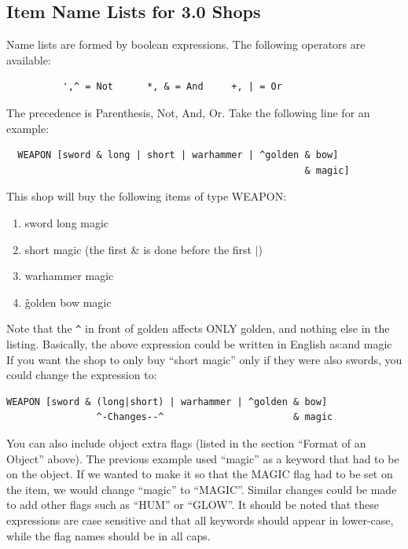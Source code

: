 \documentclass[11pt]{article}
\begin{document}
\subsection{Item Name Lists for 3.0 Shops}
Name lists are formed by boolean expressions.  The following operators are available:
\begin{verbatim}
          ',^ = Not      *, & = And     +, | = Or
\end{verbatim}
The precedence is Parenthesis, Not, And, Or.  Take the following line for an example:
\begin{verbatim}
  WEAPON [sword & long | short | warhammer | ^golden & bow]
                                                     & magic]
\end{verbatim}
This shop will buy the following items of type WEAPON:
\begin{enumerate}
\item sword long magic
\item short magic (the first \& is done before the first $|$)
\item warhammer magic
\item \^golden bow magic
\end{enumerate}
Note that the \texttt{\^} in front of golden affects ONLY golden, and nothing else in the listing.  Basically, the above expression could be written in English as: and magic\newline
If you want the shop to only buy ``short magic'' only if they were also swords, you could change the expression to:
\begin{verbatim}
WEAPON [sword & (long|short) | warhammer | ^golden & bow]
                ^-Changes--^                       & magic
\end{verbatim}
You can also include object extra flags (listed in the section ``Format of an Object'' above).  The previous example used ``magic'' as a keyword that had to be on the object.  If we wanted to make it so that the MAGIC flag had to be set on the item, we would change ``magic'' to ``MAGIC''.  Similar changes could be made to add other flags such as ``HUM'' or ``GLOW''.  It should be noted that these expressions are case sensitive and that all keywords should appear in lower-case, while the flag names should be in all caps.
\end{document}

